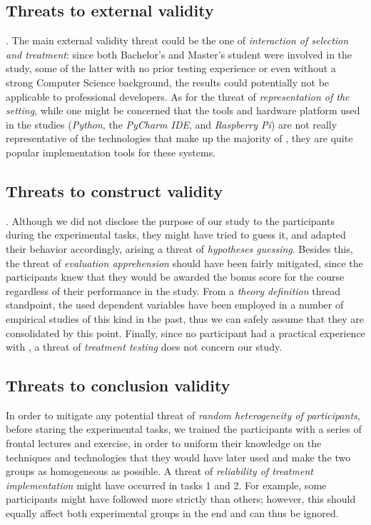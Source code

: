 \subsection{Threats to external validity}.
The main external validity threat could be the one of \textit{interaction of selection and treatment}: since both Bachelor's and Master's student were involved in the study, some of the latter with no prior testing experience or even without a strong Computer Science background, the results could potentially not be applicable to professional developers. 
As for the threat of \textit{representation of the setting}, while one might be concerned that the tools and hardware platform used in the studies (\ie \textit{Python}, the \textit{PyCharm IDE}, and \textit{Raspberry Pi}) are not really representative of the technologies that make up the majority of \ess, they are quite popular implementation tools for these systems. 

\subsection{Threats to construct validity}.
Although we did not disclose the purpose of our study to the participants during the experimental tasks, they might have tried to guess it, and adapted their behavior accordingly, arising a threat of \textit{hypotheses guessing}. 
Besides this, the threat of \textit{evaluation apprehension} should have been fairly mitigated, since the participants knew that they would be awarded the bonus score for the course regardless of their performance in the study.
From a \textit{theory definition} thread standpoint, the used dependent variables have been employed in a number of empirical studies of this kind in the past, thus we can safely assume that they are consolidated by this point. Finally, since no participant had a practical experience with \tdd, a threat of \textit{treatment testing} does not concern our study.

\subsection{Threats to conclusion validity}
In order to mitigate any potential threat of \textit{random heterogeneity of participants}, before staring the experimental tasks, we trained the participants with a series of frontal lectures and exercise, in order to uniform their knowledge on the techniques and technologies that they would have later used and make the two groups as homogeneous as possible. 
A threat of \textit{reliability of treatment implementation} might have occurred in tasks 1 and 2. For example, some participants might have followed \tdd more strictly than others; however, this should equally affect both experimental groups in the end and can thus be ignored. 
